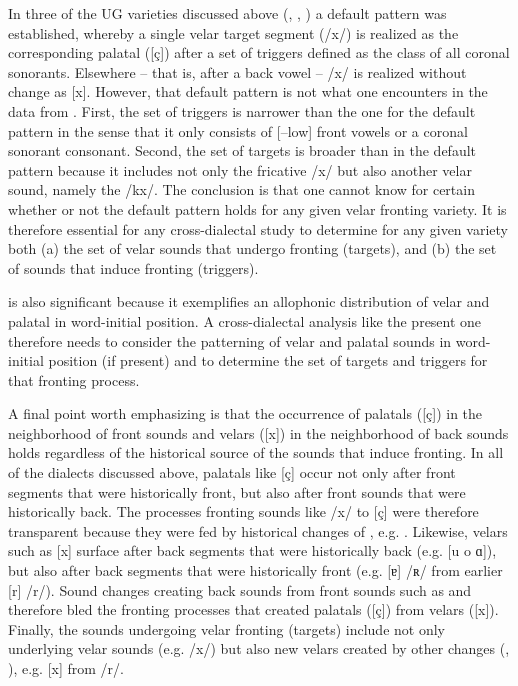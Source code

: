 In three of the UG varieties discussed above (, , ) a default pattern was established, whereby a single velar target segment (/x/) is realized as the corresponding palatal ([ç]) after a set of triggers defined as the class of all coronal sonorants. Elsewhere -- that is, after a back vowel -- /x/ is realized without change as [x]. However, that default pattern is not what one encounters in the data from . First, the set of triggers is narrower than the one for the default pattern in the sense that it only consists of [--low] front vowels or a coronal sonorant consonant. Second, the set of targets is broader than in the default pattern because it includes not only the fricative /x/ but also another velar sound, namely the  /kx/. The conclusion is that one cannot know for certain whether or not the default pattern holds for any given velar fronting variety. It is therefore essential for any cross-dialectal study to determine for any given variety both (a) the set of velar sounds that undergo fronting (targets), and (b) the set of sounds that induce fronting (triggers).

 is also significant because it exemplifies an allophonic distribution of velar and palatal in word-initial position. A cross-dialectal analysis like the present one therefore needs to consider the patterning of velar and palatal sounds in word-initial position (if present) and to determine the set of targets and triggers for that fronting process.

A final point worth emphasizing is that the occurrence of palatals ([ç]) in the neighborhood of front sounds and velars ([x]) in the neighborhood of back sounds holds regardless of the historical source of the sounds that induce fronting. In all of the dialects discussed above, palatals like [ç] occur not only after front segments that were historically front, but also after front sounds that were historically back. The processes fronting sounds like /x/ to [ç] were therefore transparent because they were fed by historical changes of , e.g. . Likewise, velars such as [x] surface after back segments that were historically back (e.g. [u o ɑ]), but also after back segments that were historically front (e.g. [ɐ] /ʀ/ from earlier [r] /r/). Sound changes creating back sounds from front sounds such as  and  therefore bled the fronting processes that created palatals ([ç]) from velars ([x]). Finally, the sounds undergoing velar fronting (targets) include not only underlying velar sounds (e.g. /x/) but also new velars created by other changes (, ), e.g. [x] from /r/.
